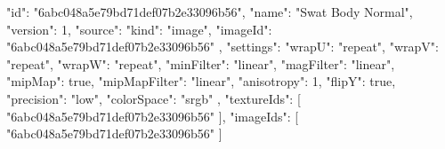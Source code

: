 {
  "id": "6abc048a5e79bd71def07b2e33096b56",
  "name": "Swat Body Normal",
  "version": 1,
  "source": {
    "kind": "image",
    "imageId": "6abc048a5e79bd71def07b2e33096b56"
  },
  "settings": {
    "wrapU": "repeat",
    "wrapV": "repeat",
    "wrapW": "repeat",
    "minFilter": "linear",
    "magFilter": "linear",
    "mipMap": true,
    "mipMapFilter": "linear",
    "anisotropy": 1,
    "flipY": true,
    "precision": "low",
    "colorSpace": "srgb"
  },
  "textureIds": [
    "6abc048a5e79bd71def07b2e33096b56"
  ],
  "imageIds": [
    "6abc048a5e79bd71def07b2e33096b56"
  ]
}
